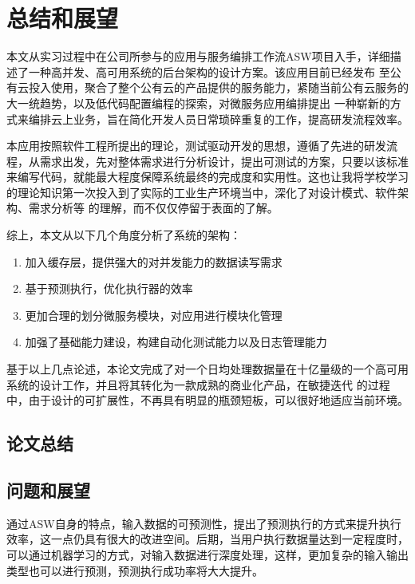 
\chapter{总结和展望}
本文从实习过程中在公司所参与的应用与服务编排工作流ASW项目入手，详细描述了一种高并发、高可用系统的后台架构的设计方案。该应用目前已经发布
至公有云投入使用，聚合了整个公有云的产品提供的服务能力，紧随当前公有云服务的大一统趋势，以及低代码配置编程的探索，对微服务应用编排提出
一种崭新的方式来编排云上业务，旨在简化开发人员日常琐碎重复的工作，提高研发流程效率。

本应用按照软件工程所提出的理论，测试驱动开发的思想，遵循了先进的研发流程，从需求出发，先对整体需求进行分析设计，提出可测试的方案，只要以该标准
来编写代码，就能最大程度保障系统最终的完成度和实用性。这也让我将学校学习的理论知识第一次投入到了实际的工业生产环境当中，深化了对设计模式、软件架构、需求分析等
的理解，而不仅仅停留于表面的了解。

综上，本文从以下几个角度分析了系统的架构：
\begin{enumerate}
    \item 加入缓存层，提供强大的对并发能力的数据读写需求
    \item 基于预测执行，优化执行器的效率
    \item 更加合理的划分微服务模块，对应用进行模块化管理
    \item 加强了基础能力建设，构建自动化测试能力以及日志管理能力
\end{enumerate}
基于以上几点论述，本论文完成了对一个日均处理数据量在十亿量级的一个高可用系统的设计工作，并且将其转化为一款成熟的商业化产品，在敏捷迭代
的过程中，由于设计的可扩展性，不再具有明显的瓶颈短板，可以很好地适应当前环境。


\section{论文总结}


\section{问题和展望}

通过ASW自身的特点，输入数据的可预测性，提出了预测执行的方式来提升执行效率，这一点仍具有很大的改进空间。后期，当用户执行数据量达到一定程度时，
可以通过机器学习的方式，对输入数据进行深度处理，这样，更加复杂的输入输出类型也可以进行预测，预测执行成功率将大大提升。